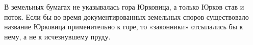 

В земельных бумагах не указывалась гора Юрковица, а только Юрков став и поток. Если бы во время документированных земельных споров существовало название Юрковица применительно к горе, то «законники» отсылались бы к нему, а не к исчезнувшему пруду.

